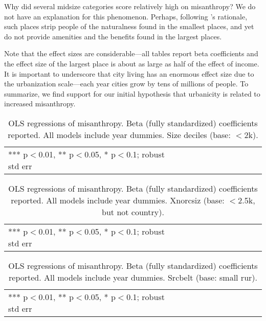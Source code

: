 \documentclass[11pt, letterpaper]{article}
\begin{document}
\begin{spacing}{1.4}
Why did several midsize categories score relatively high on misanthropy? We do not have an explanation for this phenomenon. Perhaps, following \citet{aok-ls_fisher16}'s rationale, such places strip people of the naturalness found in the smallest places, and yet do not provide amenities and the benefits found in the largest places.

Note that the effect sizes are considerable---all tables report beta coefficients
and the effect size of the largest place is about as large as half of the effect
of income. It is important to underscore that city living has an enormous effect size due to the urbanization scale---each year cities
grow by tens of millions of people. To summarize, we find support for our initial hypothesis that urbanicity is related to increased misanthropy. 

\begin{table}[H]\centering
\caption{OLS regressions  of misanthropy. Beta (fully standardized) coefficients
  reported. All models include year dummies. Size deciles (base: $<$2k).} \label{regA}
\begin{scriptsize} \begin{tabular}{p{1.8in}p{.45in}p{.45in}p{.45in}p{.45in}p{.45in}p{.45in}p{.45in}p{.45in}p{.45in}p{.45 in}}\hline

\hline  *** p$<$0.01, ** p$<$0.05, * p$<$0.1; robust std err
\end{tabular}\end{scriptsize}\end{table}

\begin{table}[H]\centering
\caption{OLS regressions  of misanthropy. Beta (fully standardized) coefficients
  reported. All models include year dummies.  Xnorcsiz (base: $<$2.5k, but not country).} \label{regB}
\begin{scriptsize} \begin{tabular}{p{1.8in}p{.45in}p{.45in}p{.45in}p{.45in}p{.45in}p{.45in}p{.45in}p{.45in}p{.45in}p{.45 in}}\hline

\hline  *** p$<$0.01, ** p$<$0.05, * p$<$0.1; robust std err
\end{tabular}\end{scriptsize}\end{table}

\begin{table}[H]\centering
\caption{OLS regressions  of misanthropy. Beta (fully standardized) coefficients
  reported. All models include year dummies. Srcbelt (base: small rur).} \label{regC}
\begin{scriptsize} \begin{tabular}{p{1.8in}p{.45in}p{.45in}p{.45in}p{.45in}p{.45in}p{.45in}p{.45in}p{.45in}p{.45in}p{.45 in}}\hline

\hline  *** p$<$0.01, ** p$<$0.05, * p$<$0.1; robust std err
\end{tabular}\end{scriptsize}\end{table}




\end{spacing}
\end{document}
